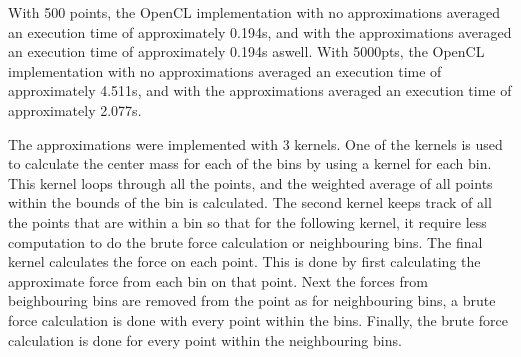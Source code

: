 \documentclass[12pt]{article}
\begin{document}
With 500 points, the OpenCL implementation with no approximations averaged an execution time of approximately 0.194s, and with the approximations averaged an execution time of approximately 0.194s aswell. With 5000pts, the OpenCL implementation with no approximations averaged an execution time of approximately 4.511s, and with the approximations averaged an execution time of approximately 2.077s.

The approximations were implemented with 3 kernels. One of the kernels is used to calculate the center mass for each of the bins by using a kernel for each bin. This kernel loops through all the points, and the weighted average of all points within the bounds of the bin is calculated. The second kernel keeps track of all the points that are within a bin so that for the following kernel, it require less computation to do the brute force calculation or neighbouring bins. The final kernel calculates the force on each point. This is done by first calculating the approximate force from each bin on that point. Next the forces from beighbouring bins are removed from the point as for neighbouring bins, a brute force calculation is done with every point within the bins. Finally, the brute force calculation is done for every point within the neighbouring bins.
\end{document}
